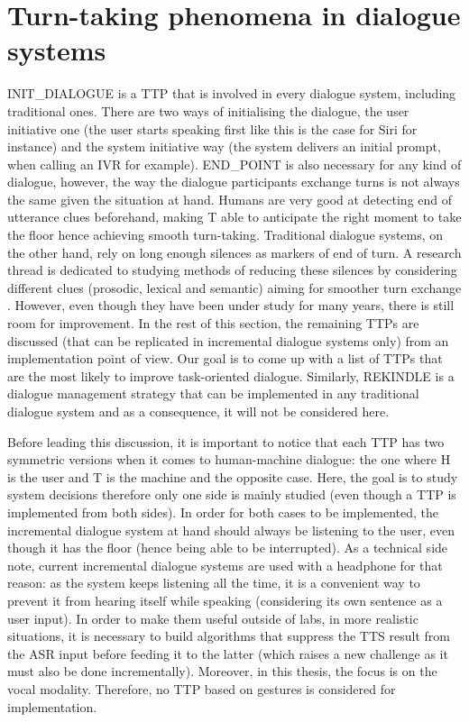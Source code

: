 	 \section{Turn-taking phenomena in dialogue systems}
	
				INIT\_DIALOGUE is a TTP that is involved in every dialogue system, including traditional ones. There are two ways of initialising the dialogue, the user initiative one (the user starts speaking first like this is the case for Siri for instance) and the system initiative way (the system delivers an initial prompt, when calling an IVR for example). END\_POINT is also necessary for any kind of dialogue, however, the way the dialogue participants exchange turns is not always the same given the situation at hand. Humans are very good at detecting end of utterance clues beforehand, making T able to anticipate the right moment to take the floor hence achieving smooth turn-taking. Traditional dialogue systems, on the other hand, rely on long enough silences as markers of end of turn. A research thread is dedicated to studying methods of reducing these silences by considering different clues (prosodic, lexical and semantic) aiming for smoother turn exchange \cite{Raux2008,Gravano2011}. However, even though they have been under study for many years, there is still room for improvement. In the rest of this section, the remaining TTPs are discussed (that can be replicated in incremental dialogue systems only) from an implementation point of view. Our goal is to come up with a list of TTPs that are the most likely to improve task-oriented dialogue. Similarly, REKINDLE is a dialogue management strategy that can be implemented in any traditional dialogue system and as a consequence, it will not be considered here.

				Before leading this discussion, it is important to notice that each TTP has two symmetric versions when it comes to human-machine dialogue: the one where H is the user and T is the machine and the opposite case. Here, the goal is to study system decisions therefore only one side is mainly studied (even though a TTP is implemented from both sides). In order for both cases to be implemented, the incremental dialogue system at hand should always be listening to the user, even though it has the floor (hence being able to be interrupted). As a technical side note, current incremental dialogue systems are used with a headphone for that reason: as the system keeps listening all the time, it is a convenient way to prevent it from hearing itself while speaking (considering its own sentence as a user input). In order to make them useful outside of labs, in more realistic situations, it is necessary to build algorithms that suppress the TTS result from the ASR input before feeding it to the latter (which raises a new challenge as it must also be done incrementally). Moreover, in this thesis, the focus is on the vocal modality. Therefore, no TTP based on gestures is considered for implementation.

